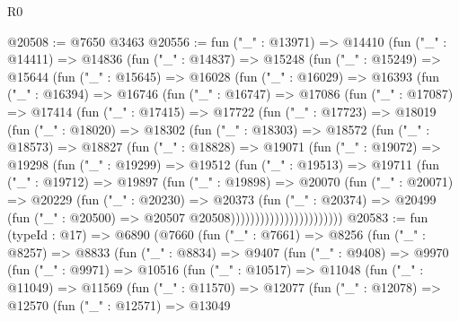 \begin{lexlean}{R0}
\begin{coremodule}
@20508 := @7650 @3463
@20556 := fun ("_" : @13971) =>
  @14410
    (fun ("_" : @14411) =>
    @14836
      (fun ("_" : @14837) =>
      @15248
        (fun ("_" : @15249) =>
        @15644
          (fun ("_" : @15645) =>
          @16028
            (fun ("_" : @16029) =>
            @16393
              (fun ("_" : @16394) =>
              @16746
                (fun ("_" : @16747) =>
                @17086
                  (fun ("_" : @17087) =>
                  @17414
                    (fun ("_" : @17415) =>
                    @17722
                      (fun ("_" : @17723) =>
                      @18019
                        (fun ("_" : @18020) =>
                        @18302
                          (fun ("_" : @18303) =>
                          @18572
                            (fun ("_" : @18573) =>
                            @18827
                              (fun ("_" : @18828) =>
                              @19071
                                (fun ("_" : @19072) =>
                                @19298
                                  (fun ("_" : @19299) =>
                                  @19512
                                    (fun ("_" : @19513) =>
                                    @19711
                                      (fun ("_" : @19712) =>
                                      @19897
                                        (fun ("_" : @19898) =>
                                        @20070
                                          (fun ("_" : @20071) =>
                                          @20229
                                            (fun ("_" : @20230) =>
                                            @20373
                                              (fun ("_" : @20374) =>
                                              @20499
                                                (fun ("_" : @20500) =>
                                                @20507 @20508)))))))))))))))))))))))
@20583 := fun (typeId : @17) =>
  @6890
    (@7660
      (fun ("_" : @7661) =>
      @8256
        (fun ("_" : @8257) =>
        @8833
          (fun ("_" : @8834) =>
          @9407
            (fun ("_" : @9408) =>
            @9970
              (fun ("_" : @9971) =>
              @10516
                (fun ("_" : @10517) =>
                @11048
                  (fun ("_" : @11049) =>
                  @11569
                    (fun ("_" : @11570) =>
                    @12077
                      (fun ("_" : @12078) =>
                      @12570
                        (fun ("_" : @12571) =>
                        @13049

\end{coremodule}
\end{lexlean}
